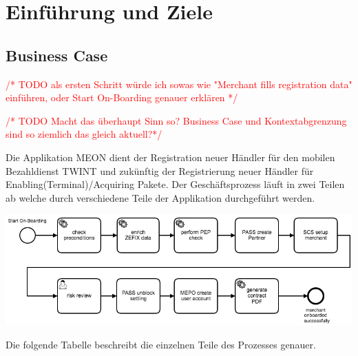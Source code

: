 \graphicspath{{./images/}}


\chapter{Einführung und Ziele}

\section{Business Case}
\label{businesscase}

\textcolor{red}{/* TODO als ersten Schritt würde ich sowas wie "Merchant fills registration data" einführen, oder Start On-Boarding genauer erklären */}


\textcolor{red}{/* TODO Macht das überhaupt Sinn so? Business Case und Kontextabgrenzung sind so ziemlich das gleich aktuell?*/}

Die Applikation MEON dient der Registration neuer Händler für den mobilen Bezahldienst TWINT und zukünftig der Registrierung neuer Händler für Enabling(Terminal)/Acquiring Pakete.  Der Geschäftsprozess läuft in zwei Teilen ab welche durch verschiedene Teile der Applikation durchgeführt werden.

\begin{center}
	\includegraphics[scale=0.4]{meon-workflow.png}
\end{center}

Die folgende Tabelle beschreibt die einzelnen Teile des Prozesses genauer.

